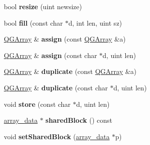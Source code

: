\begin{DoxyCompactItemize}
\item 
\hypertarget{class_q_g_array_a8f92239def71f172d0c7e40757cffb2d}{bool {\bfseries resize} (uint newsize)}\label{class_q_g_array_a8f92239def71f172d0c7e40757cffb2d}

\item 
\hypertarget{class_q_g_array_aa10bfe7ecfbfe19c238c3e27aa8bba61}{bool {\bfseries fill} (const char $\ast$d, int len, uint sz)}\label{class_q_g_array_aa10bfe7ecfbfe19c238c3e27aa8bba61}

\item 
\hypertarget{class_q_g_array_abcbdd077ec1994046edf3dd48f8e4998}{\hyperlink{class_q_g_array}{Q\-G\-Array} \& {\bfseries assign} (const \hyperlink{class_q_g_array}{Q\-G\-Array} \&a)}\label{class_q_g_array_abcbdd077ec1994046edf3dd48f8e4998}

\item 
\hypertarget{class_q_g_array_a8fa22d65015263cd845a16bd5fdfae9e}{\hyperlink{class_q_g_array}{Q\-G\-Array} \& {\bfseries assign} (const char $\ast$d, uint len)}\label{class_q_g_array_a8fa22d65015263cd845a16bd5fdfae9e}

\item 
\hypertarget{class_q_g_array_ab6b821bb34510b6fc95af85ab28dc6b8}{\hyperlink{class_q_g_array}{Q\-G\-Array} \& {\bfseries duplicate} (const \hyperlink{class_q_g_array}{Q\-G\-Array} \&a)}\label{class_q_g_array_ab6b821bb34510b6fc95af85ab28dc6b8}

\item 
\hypertarget{class_q_g_array_ac67ef2d174df4fa82075d801668d5653}{\hyperlink{class_q_g_array}{Q\-G\-Array} \& {\bfseries duplicate} (const char $\ast$d, uint len)}\label{class_q_g_array_ac67ef2d174df4fa82075d801668d5653}

\item 
\hypertarget{class_q_g_array_af173b8c1f9ca8415f9fb661eed8e45a0}{void {\bfseries store} (const char $\ast$d, uint len)}\label{class_q_g_array_af173b8c1f9ca8415f9fb661eed8e45a0}

\item 
\hypertarget{class_q_g_array_ac6281178ce8e5c6b8d07d6b4e403789c}{\hyperlink{struct_q_g_array_1_1array__data}{array\-\_\-data} $\ast$ {\bfseries shared\-Block} () const }\label{class_q_g_array_ac6281178ce8e5c6b8d07d6b4e403789c}

\item 
\hypertarget{class_q_g_array_a2819c6b309e1a21fd202be0cf0243dd2}{void {\bfseries set\-Shared\-Block} (\hyperlink{struct_q_g_array_1_1array__data}{array\-\_\-data} $\ast$p)}\label{class_q_g_array_a2819c6b309e1a21fd202be0cf0243dd2}


\end{DoxyCompactItemize}
